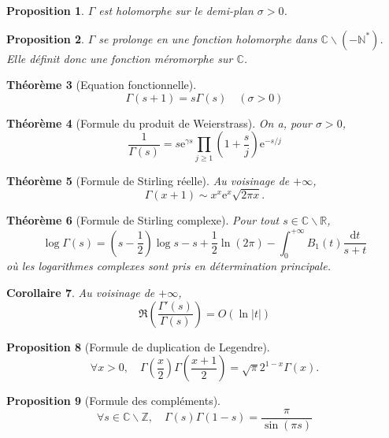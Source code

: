 \documentclass[french]{report}
\newtheorem{theorem}{Théorème}[section]
\newtheorem{proposition}[theorem]{Proposition}
\newtheorem{corollary}[theorem]{Corollaire}
\begin{document}
\begin{proposition}
  $\Gamma$ est holomorphe sur le demi-plan $\sigma>0$.
\end{proposition}

\begin{proposition}
  $\Gamma$ se prolonge en une fonction holomorphe dans $\mathbb{C}\backslash(-\mathbb{N}^*)$. Elle définit donc une fonction méromorphe sur $\mathbb{C}$.
\end{proposition}

\begin{theorem}[Equation fonctionnelle]\label{thm:gamma-equation-fonctionnelle}
  \[
    \Gamma(s+1)=s\Gamma(s)\quad(\sigma>0)
  \]
\end{theorem}

\begin{theorem}[Formule du produit de Weierstrass]\label{thm:gamma-weierstrass}
  On a, pour $\sigma>0$,
  \[
    \frac{1}{\Gamma(s)}
    =s\mathrm{e}^{\gamma s}\prod_{j\geq 1}\left(1+\frac{s}{j}\right)\mathrm{e}^{-s/j}
  \]
\end{theorem}

\begin{theorem}[Formule de Stirling réelle]\label{thm:stirling-reel}
  Au voisinage de $+\infty$,
  \[
    \Gamma(x+1)
    \sim x^x\mathrm{e}^x\sqrt{2\pi x}.
  \]
\end{theorem}

\begin{theorem}[Formule de Stirling complexe]\label{thm:stirling-complexe}
  Pour tout $s\in\mathbb{C}\backslash\mathbb{R}$,
  \[
    \log\Gamma(s)
    = (s-\frac{1}{2})\log s
    - s
    + \frac{1}{2}\ln(2\pi)
    - \int_0^{+\infty} B_1(t)\frac{\mathrm{d}t}{s+t}
  \]
  où les logarithmes complexes sont pris en détermination principale.
\end{theorem}

\begin{corollary}\label{cor:gamma-gamma-prime-majoration}
  Au voisinage de $+\infty$,
  \[
    \Re\left(\frac{\Gamma'(s)}{\Gamma(s)}\right) = O(\ln|t|)
  \]
\end{corollary}

\begin{proposition}[Formule de duplication de Legendre]\label{prop:gamma-duplication-legendre}
  \[
    \forall x>0,\quad
    \Gamma\left(\frac{x}{2}\right)\Gamma\left(\frac{x+1}{2}\right)
    =\sqrt{\pi}2^{1-x}\Gamma(x).
  \]
\end{proposition}

\begin{proposition}[Formule des compléments]\label{prop:gamma-formule-complements}
  \[
    \forall s\in\mathbb{C}\backslash\mathbb{Z},\quad
    \Gamma(s)\Gamma(1-s)=\frac{\pi}{\sin(\pi s)}
  \]
\end{proposition}
\end{document}
